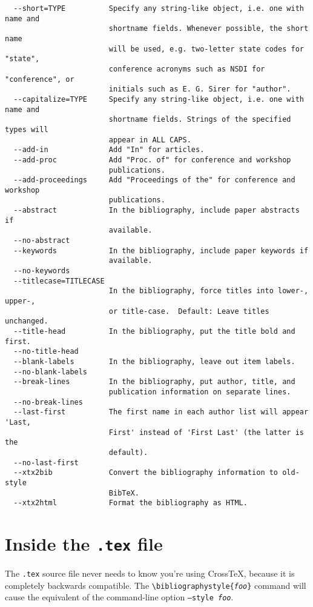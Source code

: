 \documentclass{article}
\newcommand{\XTeX}{Cross\TeX}
\begin{document}
\begin{small}
\begin{verbatim}
  --short=TYPE          Specify any string-like object, i.e. one with name and
                        shortname fields. Whenever possible, the short name
                        will be used, e.g. two-letter state codes for "state",
                        conference acronyms such as NSDI for "conference", or
                        initials such as E. G. Sirer for "author".
  --capitalize=TYPE     Specify any string-like object, i.e. one with name and
                        shortname fields. Strings of the specified types will
                        appear in ALL CAPS.
  --add-in              Add "In" for articles.
  --add-proc            Add "Proc. of" for conference and workshop
                        publications.
  --add-proceedings     Add "Proceedings of the" for conference and workshop
                        publications.
  --abstract            In the bibliography, include paper abstracts if
                        available.
  --no-abstract         
  --keywords            In the bibliography, include paper keywords if
                        available.
  --no-keywords         
  --titlecase=TITLECASE
                        In the bibliography, force titles into lower-, upper-,
                        or title-case.  Default: Leave titles unchanged.
  --title-head          In the bibliography, put the title bold and first.
  --no-title-head       
  --blank-labels        In the bibliography, leave out item labels.
  --no-blank-labels     
  --break-lines         In the bibliography, put author, title, and
                        publication information on separate lines.
  --no-break-lines      
  --last-first          The first name in each author list will appear 'Last,
                        First' instead of 'First Last' (the latter is the
                        default).
  --no-last-first       
  --xtx2bib             Convert the bibliography information to old-style
                        BibTeX.
  --xtx2html            Format the bibliography as HTML.
\end{verbatim}\end{small}

\section{Inside the \texttt{.tex} file}

The \texttt{.tex} source file never needs to know you're using \XTeX{}, because it is completely backwards compatible. The \texttt{\textbackslash{}bibliographystyle\{\textrm{\textit{foo}}\}} command will cause the equivalent of the command-line option \texttt{--style \textrm{\textit{foo}}}.
\end{document}

